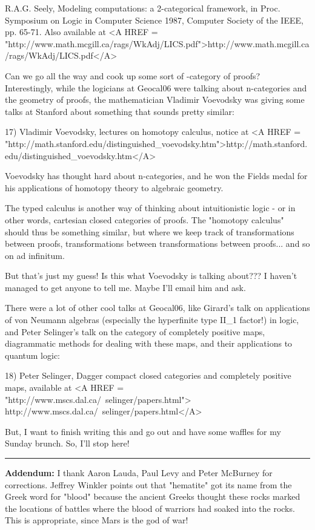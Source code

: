 R.A.G. Seely, Modeling computations: a 2-categorical framework, in 
Proc. Symposium on Logic in Computer Science 1987, Computer Society 
of the IEEE, pp. 65-71.  Also available at 
<A HREF = "http://www.math.mcgill.ca/rags/WkAdj/LICS.pdf">http://www.math.mcgill.ca/rags/WkAdj/LICS.pdf</A>

Can we go all the way and cook up some sort of \omega -category of proofs?  
Interestingly,
while the logicians at Geocal06 were talking about n-categories and
the geometry of proofs, the mathematician Vladimir Voevodsky was giving
some talks at Stanford about something that sounds pretty similar:

17) Vladimir Voevodsky, lectures on homotopy \lambda  calculus, 
notice at <A HREF = "http://math.stanford.edu/distinguished_voevodsky.htm">http://math.stanford.edu/distinguished_voevodsky.htm</A>  

Voevodsky has thought hard about n-categories, and he won the 
Fields medal for his applications of homotopy theory to algebraic 
geometry.  

The typed \lambda  calculus is another way of thinking about intuitionistic 
logic - or in other words, cartesian closed categories of proofs.  The 
"homotopy \lambda  calculus" should thus be something similar, but where 
we keep track of transformations between proofs, transformations
between transformations between proofs... and so on ad infinitum.

But that's just my guess!  Is this what Voevodsky is talking about???
I haven't managed to get anyone to tell me.  Maybe I'll email him and ask.

There were a lot of other cool talks at Geocal06, like Girard's talk
on applications of von Neumann algebras (especially the hyperfinite 
type II_{1} 
factor!) in logic, and Peter Selinger's talk on the category of
completely positive maps, diagrammatic methods for dealing with these
maps, and their applications to quantum logic:

18) Peter Selinger, Dagger compact closed categories and completely
positive maps, available at 
<A HREF = "http://www.mscs.dal.ca/~selinger/papers.html">
http://www.mscs.dal.ca/~selinger/papers.html</A>

But, I want to finish writing this and go out and have some waffles
for my Sunday brunch.  So, I'll stop here!

\par\noindent\rule{\textwidth}{0.4pt}
\textbf{Addendum:} I thank Aaron Lauda, Paul Levy
and Peter McBurney for corrections.
Jeffrey Winkler points out that "hematite" got its name 
from the Greek word for "blood" because the ancient Greeks
thought these rocks marked the locations of battles where
the blood of warriors had soaked into the rocks.  This is appropriate,
since Mars is the god of war!   

